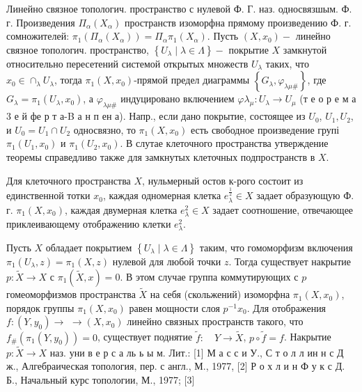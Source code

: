 \documentclass[10pt]{article}
\begin{document}
Линейно связное топологич. пространство с нулевой Ф. Г. наз. односвязшым. Ф. г. Произведения $\Pi_{\alpha}\left(X_{\alpha}\right)$ пространств изоморфна прямому произведению Ф. г. сомножителей: $\pi_{1}\left(\Pi_{\alpha}\left(X_{\alpha}\right)\right)=\Pi_{\alpha} \pi_{1}\left(X_{\alpha}\right)$. Пусть $\left(X, x_{0}\right)-$ линейно связное топологич. пространство, $\left\{U_{\lambda} \mid \lambda \in \Lambda\right\}-$ покрытие $X$ замкнутой относительно пересетений системой открытых множеств $U_{\lambda}$ таких, что $x_{0} \in \cap_{\lambda} U_{\lambda}$, тогда $\pi_{1}\left(X, x_{0}\right)$-прямой предел диаграммы $\left\{G_{\lambda}, \varphi_{\lambda \mu \#}\right\}$, где $G_{\lambda}=\pi_{1}\left(U_{\lambda}, x_{0}\right)$, а $\varphi_{\lambda \mu \#}$ индуцировано включением $\varphi \lambda_{\mu}: U_{\lambda} \longrightarrow U_{\mu}$ (т е о р е м а 3 е й фе р т а-B а н п ен а). Напр., если дано покрытие, состоящее из $U_{0}$, $U_{1}, U_{2}$, и $U_{0}=U_{1} \cap U_{2}$ односвязно, то $\pi_{1}\left(X, x_{0}\right)$ есть свободное произведение групі $\pi_{1}\left(U_{1}, x_{0}\right)$ и $\pi_{1}\left(U_{2}, x_{0}\right)$. В слутае клеточного пространства утверждение теоремы справедливо также для замкнутых клеточных подпространств в $X$.



Для клеточного пространства $X$, нульмерный остов к-рого состоит из единственной тотки $x_{0}$, каждая одномерная клетка $e_{\lambda}^{\frac{1}{2}} \in X$ задает образующую Ф. г. $\pi_{1}\left(X, x_{0}\right)$, каждая двумерная клетка $e_{\lambda}^{2} \in X$ задает соотношение, отвечающее приклеивающему отображению клетки $e_{\lambda}^{2}$.



Пусть $X$ обладает покрытием $\left\{U_{\lambda} \mid \lambda \in \Lambda\right\}$ таким, что гомоморфизм включения $\pi_{1}\left(U_{\lambda}, z\right)=\pi_{1}(X, z)$ нулевой для любой точки $z$. Тогда существует накрытие $p: \widetilde{X} \rightarrow X$ с $\pi_{1}(\tilde{X}, x)=0$. В этом случае группа коммутирующих с $p$ гомеоморфизмов пространства $\tilde{X}$ на себя (скольжений) изоморфна $\pi_{1}\left(X, x_{0}\right)$, порядок группы $\pi_{1}\left(X, x_{0}\right)$ равен мощности слоя $p^{-1} x_{0}$. Для отображения $f:\left(Y, y_{0}\right) \rightarrow$ $\rightarrow\left(X, x_{0}\right)$ линейно связных пространств такого, что $f_{\#}\left(\pi_{1}\left(Y, y_{0}\right)\right)=0$, существует поднятие $\tilde{f}: \quad Y \longrightarrow \tilde{X}$, $p \circ \tilde{f}=f$. Накрытие $p: \tilde{X} \longrightarrow X$ наз. уни в е р с а ль ь ы м. Лит.: [1] М а с с и У., С т о л л ин н с Д ж., Алгебраическая топология, пер. с англ., М., 1977, [2] Р о х л и н Ф у к с Д. Б., Начальный курс топологии, М., 1977; [3]
\end{document}
